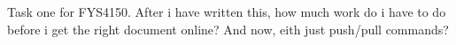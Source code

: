 \documentclass{article}
\begin{document}
Task one for FYS4150. After i have written this, how much work do i have to do before i get the right document online? And now, eith just push/pull commands?
\end{document}
